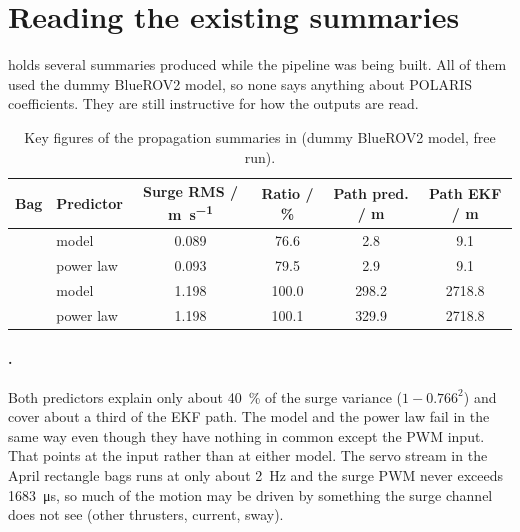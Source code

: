\section{Reading the existing summaries}

 holds several summaries produced while the pipeline was being built.
All of them used the dummy BlueROV2 model, so none says anything about POLARIS
coefficients. They are still instructive for how the outputs are read.

\begin{table}[htbp]
\centering
\caption{Key figures of the propagation summaries in  (dummy
BlueROV2 model, free run).}
\label{tab:summaries}
\small
\begin{tabular}{@{}l l S[table-format=1.3] S[table-format=3.1] S[table-format=4.1] S[table-format=4.1]@{}}
\toprule
Bag & Predictor & {Surge RMS / \unit{\meter\per\second}} & {Ratio / \unit{\percent}} & {Path pred. / \unit{\meter}} & {Path EKF / \unit{\meter}} \\
\midrule
{} & model & 0.089 & 76.6 & 2.8 & 9.1 \\
 & power law & 0.093 & 79.5 & 2.9 & 9.1 \\
 & model & 1.198 & 100.0 & 298.2 & 2718.8 \\
 & power law & 1.198 & 100.1 & 329.9 & 2718.8 \\
\bottomrule
\end{tabular}
\end{table}
\FloatBarrier

\paragraph{.} Both predictors explain only about
\qty{40}{\percent} of the surge variance ($1 - 0.766^2$) and cover about a third of the EKF path. The model and the power law fail in the same way
even though they have nothing in common except the PWM input. That points at the input rather than at
either model. The servo stream in the April rectangle bags runs at only about \qty{2}{\hertz} and the
surge PWM never exceeds \qty{1683}{\micro\second}, so much of the motion may be driven by
something the surge channel does not see (other thrusters, current, sway).

